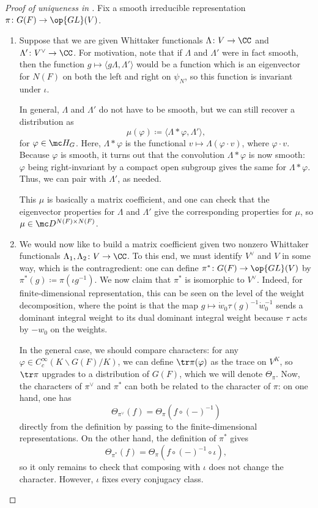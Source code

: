 \documentclass[../notes.tex]{subfiles}
\begin{document}
\begin{proof}[Proof of uniqueness in ]
	Fix a smooth irreducible representation $\pi\colon G(F)\to\op{GL}(V)$.
	\begin{enumerate}
		\item Suppose that we are given Whittaker functionals $\Lambda\colon V\to\CC$ and $\Lambda'\colon V^\lor\to\CC$. For motivation, note that if $\Lambda$ and $\Lambda'$ were in fact smooth, then the function $g\mapsto\langle g\Lambda,\Lambda'\rangle$ would be a function which is an eigenvector for $N(F)$ on both the left and right on $\psi_N$, so this function is invariant under $\iota$.

		In general, $\Lambda$ and $\Lambda'$ do not have to be smooth, but we can still recover a distribution as
		\[\mu(\varphi)\coloneqq\langle\Lambda*\varphi,\Lambda'\rangle,\]
		for $\varphi\in\mc H_G$. Here, $\Lambda*\varphi$ is the functional $v\mapsto\Lambda(\varphi\cdot v)$, where $\varphi\cdot v$. Because $\varphi$ is smooth, it turns out that the convolution $\Lambda*\varphi$ is now smooth: $\varphi$ being right-invariant by a compact open subgroup gives the same for $\Lambda*\varphi$. Thus, we can pair with $\Lambda'$, as needed.

		This $\mu$ is basically a matrix coefficient, and one can check that the eigenvector properties for $\Lambda$ and $\Lambda'$ give the corresponding properties for $\mu$, so $\mu\in\mc D^{N(F)\times N(F)}$.

		\item We would now like to build a matrix coefficient given two nonzero Whittaker functionals $\Lambda_1,\Lambda_2\colon V\to\CC$. To this end, we must identify $V^\lor$ and $V$ in some way, which is the contragredient: one can define $\pi^*\colon G(F)\to\op{GL}(V)$ by $\pi^*(g)\coloneqq\pi\left(\iota g^{-1}\right)$. We now claim that $\pi^*$ is isomorphic to $V^\lor$. Indeed, for finite-dimensional representation, this can be seen on the level of the weight decomposition, where the point is that the map $g\mapsto\dot w_0\tau(g)^{-1}\dot w_0^{-1}$ sends a dominant integral weight to its dual dominant integral weight because $\tau$ acts by $-w_0$ on the weights.
		
		In the general case, we should compare characters: for any $\varphi\in C_c^\infty(K\backslash G(F)/K)$, we can define $\tr\pi(\varphi)$ as the trace on $V^K$, so $\tr\pi$ upgrades to a distribution of $G(F)$, which we will denote $\Theta_\pi$. Now, the characters of $\pi^\lor$ and $\pi^*$ can both be related to the character of $\pi$: on one hand, one has
		\[\Theta_{\pi^\lor}(f)=\Theta_\pi\left(f\circ(-)^{-1}\right)\]
		directly from the definition by passing to the finite-dimensional representations. On the other hand, the definition of $\pi^*$ gives
		\[\Theta_{\pi^*}(f)=\Theta_\pi\left(f\circ(-)^{-1}\circ\iota\right),\]
		so it only remains to check that composing with $\iota$ does not change the character. However, $\iota$ fixes every conjugacy class.


\end{enumerate}
\end{proof}
\end{document}
